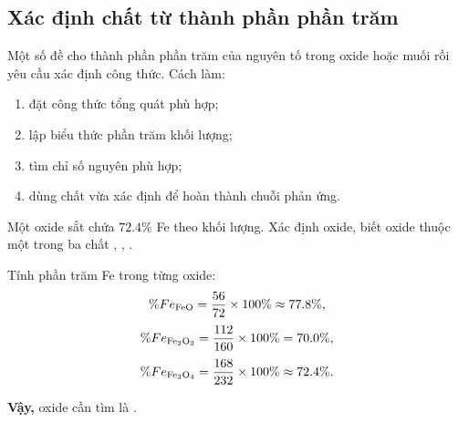 \subsection{Xác định chất từ thành phần phần trăm}

Một số đề cho thành phần phần trăm của nguyên tố trong oxide hoặc muối rồi yêu cầu xác định công thức. Cách làm:
\begin{enumerate}
\item đặt công thức tổng quát phù hợp;
\item lập biểu thức phần trăm khối lượng;
\item tìm chỉ số nguyên phù hợp;
\item dùng chất vừa xác định để hoàn thành chuỗi phản ứng.
\end{enumerate}

\begin{vidu}
Một oxide sắt chứa $72.4\%$ Fe theo khối lượng. Xác định oxide, biết oxide thuộc một trong ba chất , , .
\end{vidu}
\begin{loigiai}
Tính phần trăm Fe trong từng oxide:
\[
\%Fe_{\ce{FeO}}=\frac{56}{72}\times100\%\approx77.8\%,
\]
\[
\%Fe_{\ce{Fe2O3}}=\frac{112}{160}\times100\%=70.0\%,
\]
\[
\%Fe_{\ce{Fe3O4}}=\frac{168}{232}\times100\%\approx72.4\%.
\]

\textbf{Vậy,} oxide cần tìm là .
\end{loigiai}
